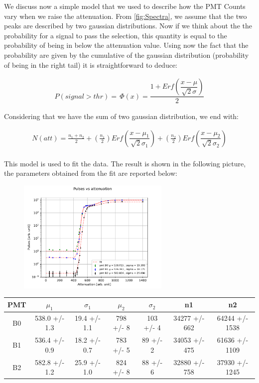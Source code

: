 We discuss now a simple model that we used to describe how the PMT Counts vary when we raise the attenuation. From \ref{fig:Spectra}, we assume that the two peaks are described by two gaussian distributions. Now if we think about the the probability for a signal to pass the selection, this quantity is equal to the probability of being in below the attenuation value. Using now the fact that the probability are given by the cumulative of the gaussian distribution (probability of being in the right tail) it is straightforward to deduce:

\begin{align*}
P(signal > thr) = \, \Phi(x) = \dfrac{1 + Erf(\dfrac{x - \mu}{\sqrt{2} \sigma })}{2}
\end{align*}

Considering that we have the sum of two gaussian distribution, we end with:

\begin{equation}
\begin{split}
N(att) = \frac{n_{1} + n_{2}}{2} + (\frac{n_{1}}{2}) Erf(\dfrac{x - \mu_{1}}{\sqrt{2} \sigma_{1} })   + (\frac{n_{2}}{2}) Erf(\dfrac{x - \mu_{2}}{\sqrt{2} \sigma_{2}}) \\
\end{split}
\end{equation}

This model is used to fit the data. The result is shown in the following picture, the parameters obtained from the fit are reported below:

\begin{figure}
\centering
\includegraphics[width = 0.65\textwidth ]{Analysis/CalibrationPMT/Fit_attenuation.pdf}
\end{figure}

\begin{table}
\centering
\begin{tabular}{c|c|c|c|c|c|c}
\hline
 PMT   &  $\mu_{1}$         &  $\sigma_{1}$         & $\mu_{2}$          & $\sigma_{2}$   & n1                & n2                 \\
\hline
 B0    & 538.0 +/- 1.3 & 19.4 +/- 1.1 & 798 +/- 8 & 103 +/- 4 & 34277 +/- 662 & 64244 +/- 1538 \\
 B1    & 536.4 +/- 0.9 & 18.2 +/- 0.7 & 783 +/- 5 & 89 +/- 2  & 34053 +/- 475 & 61636 +/- 1109 \\
 B2    & 582.8 +/- 1.2 & 25.9 +/- 1.0 & 824 +/- 8 & 88 +/- 6  & 32880 +/- 758 & 37930 +/- 1245 \\
\hline
\end{tabular}
\end{table}

